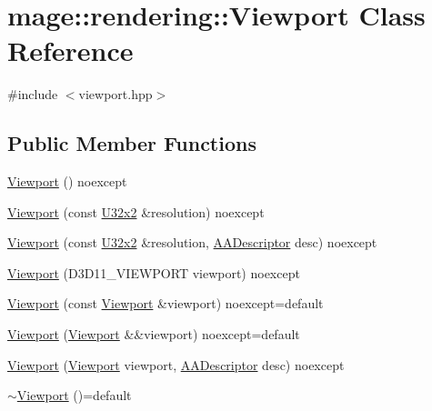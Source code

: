 \hypertarget{classmage_1_1rendering_1_1_viewport}{}\section{mage\+:\+:rendering\+:\+:Viewport Class Reference}
\label{classmage_1_1rendering_1_1_viewport}


{\ttfamily \#include $<$viewport.\+hpp$>$}

\subsection*{Public Member Functions}
\begin{DoxyCompactItemize}
\item 
\hyperlink{classmage_1_1rendering_1_1_viewport_a93c3a23a87fb30301ab9f400bd2c128a}{Viewport} () noexcept
\item 
\hyperlink{classmage_1_1rendering_1_1_viewport_a04b2198ce2554fd849d713bc6551565d}{Viewport} (const \hyperlink{namespacemage_a88e05bff0300120c013285d3dcad95c5}{U32x2} \&resolution) noexcept
\item 
\hyperlink{classmage_1_1rendering_1_1_viewport_a2e9aafc771d765259669f0bbeb8fffac}{Viewport} (const \hyperlink{namespacemage_a88e05bff0300120c013285d3dcad95c5}{U32x2} \&resolution, \hyperlink{namespacemage_1_1rendering_a25c189fd1da946d7a8f0abdd4f0e6afa}{A\+A\+Descriptor} desc) noexcept
\item 
\hyperlink{classmage_1_1rendering_1_1_viewport_a0fb086c9d200adabbd18dcd6ac11495d}{Viewport} (D3\+D11\+\_\+\+V\+I\+E\+W\+P\+O\+RT viewport) noexcept
\item 
\hyperlink{classmage_1_1rendering_1_1_viewport_ae5fe479caecadc9639d359c139517da6}{Viewport} (const \hyperlink{classmage_1_1rendering_1_1_viewport}{Viewport} \&viewport) noexcept=default
\item 
\hyperlink{classmage_1_1rendering_1_1_viewport_a33d8073522c9ac9044da148b44023b2b}{Viewport} (\hyperlink{classmage_1_1rendering_1_1_viewport}{Viewport} \&\&viewport) noexcept=default
\item 
\hyperlink{classmage_1_1rendering_1_1_viewport_a44628345c04b020a2ceef42074b32c8b}{Viewport} (\hyperlink{classmage_1_1rendering_1_1_viewport}{Viewport} viewport, \hyperlink{namespacemage_1_1rendering_a25c189fd1da946d7a8f0abdd4f0e6afa}{A\+A\+Descriptor} desc) noexcept
\item 
\hyperlink{classmage_1_1rendering_1_1_viewport_a7613c529c64ef903abe310ef345cc864}{$\sim$\+Viewport} ()=default

\end{DoxyCompactItemize}
